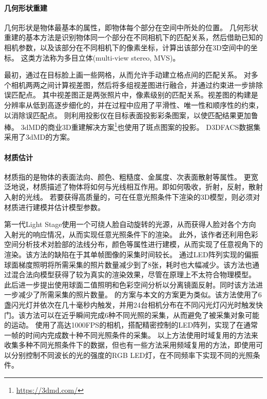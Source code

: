 \paragraph{几何形状重建}
几何形状是物体最基本的属性，即物体每个部分在空间中所处的位置。
几何形状重建的基本方法是识别物体同一个部分在不同相机下的匹配关系，然后借助已知的相机参数，以及该部分在不同相机下的像素坐标，计算出该部分在3D空间中的坐标。
这类方法称为多目立体(multi-view stereo, MVS)。

最初，\citet{PFM}通过在目标脸上画一些网格，从而允许手动建立格点间的匹配关系。
\citet{ss_geo}对多个相机两两之间计算视差图，然后将多组视差图进行融合，并通过约束进一步排除误匹配点。
其中视差图正是两张照片中，像素级别的匹配关系。视差图的构建是分辨率从低到高逐步细化的，并在过程中应用了平滑性、唯一性和顺序性的约束，以消除误匹配点。
\citet{DEP}则利用投影仪在目标表面投影彩条图案，以使匹配结果更加鲁棒。
3dMD的商业3D重建解决方案\footnote{\url{https://3dmd.com/}}也使用了斑点图案的投影。
D3DFACS\citep{D3DFACS}数据集采用了3dMD的方案。

\paragraph{材质估计}
材质指的是物体的表面法向、颜色、粗糙度、金属度、次表面散射等属性。
更宽泛地说，材质描述了物体将如何与光线相互作用。即如何吸收，折射，反射，散射入射的光线。
若要获得高质量的，可在任意光照条件下渲染的3D模型，则必须对材质进行建模并估计模型参数。

第一代Light Stage\citep{light_stage}使用一个可绕人脸自动旋转的光源，从而获得人脸对各个方向入射光的响应情况，从而实现任意光照条件下的渲染。
此外，该作者还利用色彩空间分析技术\cite{temporal_color}对脸部的法线分布，颜色等属性进行建模，从而实现了任意视角下的渲染。该方法的缺陷在于其单帧图像的采集时间较长。
\citet{MaHPCWD07}通过LED阵列实现的偏振球面梯度照明将所需采集的照片数量减少到了8张，耗时也大幅减少。该方法也通过混合法向模型获得了较为真实的渲染效果，尽管在原理上不太符合物理模型。
此后\citet{KampourisZG18}进一步提出使用球面二值照明和色彩空间分析\cite{MallickZKB05}以分离镜面反射。同时该方法进一步减少了所需采集的照片数量。
\citet{FyffeGTGD16}的方案与本文的方案更为类似。该方法使用了6盏闪光灯并依次在几十毫秒内触发，并用24台相机分布在不同闪光灯闪光时触发快门。该方法可以在近乎瞬间完成6种不同光照的采集，从而避免了被采集对象可能的运动。
\citet{ZhangZZLCYXY22}使用了高达1000FPS的相机，搭配精密控制的LED阵列，实现了在通常一帧的时间内完成数十种不同光照条件的采集。
以上方法使用时域复用的方法来收集多种不同光照条件下的数据，但也有一些方法\citep{FyffeD15,MekaHPZFFKYBDDB19}采用频域复用的方法，即使用可以分别控制不同波长的光的强度的RGB LED灯，在不同频率下实现不同的光照条件。


